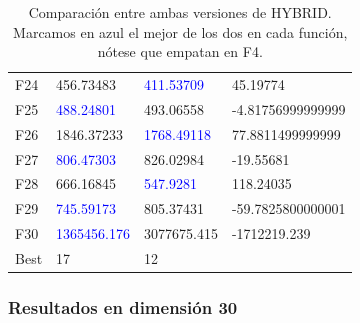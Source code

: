 \documentclass{article}
\begin{document}
\begin{table}[H]
\begin{tabular}{|l|ll|l|}
F24  &	456.73483 & \textcolor{blue}{411.53709} & 45.19774\\
F25  &	\textcolor{blue}{488.24801} & 493.06558 & -4.81756999999999\\
F26  &	1846.37233 & \textcolor{blue}{1768.49118} & 77.8811499999999\\
F27  &	\textcolor{blue}{806.47303} & 826.02984 & -19.55681\\
F28  &	666.16845 & \textcolor{blue}{547.9281} & 118.24035\\
F29  &	\textcolor{blue}{745.59173} & 805.37431 & -59.7825800000001\\
F30  &	\textcolor{blue}{1365456.176} & 3077675.415 & -1712219.239\\ \hline	
Best & 17 & 12 & {} \\
	\hline
\end{tabular}
	\caption{Comparación entre ambas versiones de HYBRID. Marcamos en azul el mejor de los dos en cada función, nótese que
	empatan en F4.}
	\label{tab:comp-hybrid-10}
\end{table}

\subsubsection*{Resultados en dimensión 30}
\end{document}
